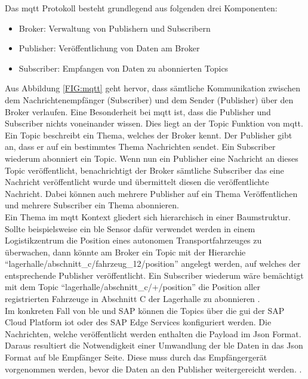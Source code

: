 \noindent Das \ac{mqtt} Protokoll besteht grundlegend aus folgenden drei Komponenten:
\begin{itemize}
	\item{Broker: Verwaltung von Publishern und Subscribern}
	\item{Publisher: Veröffentlichung von Daten am Broker}
	\item{Subscriber: Empfangen von Daten zu abonnierten Topics}
\end{itemize}
Aus Abbildung \ref{FIG:mqtt} geht hervor, dass sämtliche Kommunikation zwischen dem Nachrichtenempfänger (Subscriber) und dem Sender (Publisher) über den Broker verlaufen. Eine Besonderheit bei \ac{mqtt} ist, dass die Publisher und Subscriber nichts voneinander wissen. Dies liegt an der Topic Funktion von \ac{mqtt}. Ein Topic beschreibt ein Thema, welches der Broker kennt. Der Publisher gibt an, dass er auf ein bestimmtes Thema Nachrichten sendet. Ein Subscriber wiederum abonniert ein Topic. Wenn nun ein Publisher eine Nachricht an dieses Topic veröffentlicht, benachrichtigt der Broker sämtliche Subscriber das eine Nachricht veröffentlicht wurde und übermittelt diesen die veröffentlichte Nachricht. Dabei können auch mehrere Publisher auf ein Thema Veröffentlichen und mehrere Subscriber ein Thema abonnieren.\\

\noindent Ein Thema im \ac{mqtt} Kontext gliedert sich hierarchisch in einer Baumstruktur. Sollte beispielsweise ein \ac{ble} Sensor dafür verwendet werden in einem Logistikzentrum die Position eines autonomen Transportfahrzeuges zu überwachen, dann könnte am Broker ein Topic mit der Hierarchie "`lagerhalle/abschnitt\_c/fahrzeug\_12/position"' angelegt werden, auf welches der entsprechende Publisher veröffentlicht. Ein Subscriber wiederum wäre bemächtigt mit dem Topic "`lagerhalle/abschnitt\_c/+/position"' die Position aller registrierten Fahrzeuge in Abschnitt C der Lagerhalle zu abonnieren \cite{MQTT19:WWW}.\\

\noindent Im konkreten Fall von \ac{ble} und SAP können die Topics über die \ac{gui} der SAP Cloud Platform \ac{iot} oder des SAP Edge Services konfiguriert werden. Die Nachrichten, welche veröffentlicht werden enthalten die Payload im Json Format. Daraus resultiert die Notwendigkeit einer Umwandlung der \ac{ble} Daten in das Json Format auf \ac{ble} Empfänger Seite. Diese muss durch das Empfängergerät vorgenommen werden, bevor die Daten an den Publisher weitergereicht werden. \cite[Seite 247]{Holtschulte20:IOS}.\\ 

